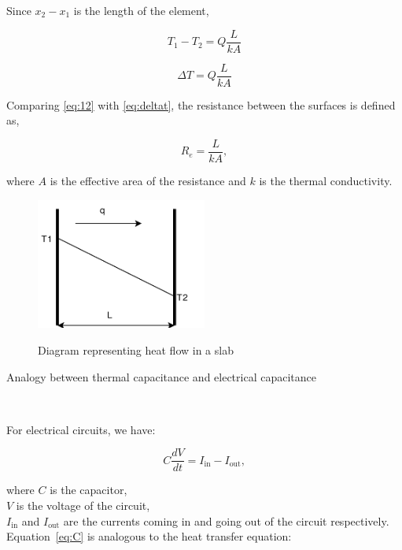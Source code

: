 Since $x_2-x_1$ is the length of the element,

\begin{equation}
T_1-T_2=Q\frac{L}{kA} \label{eq:18}
\end{equation}

\begin{equation}
\Delta T=Q\frac{L}{kA} \label{eq:deltat}
\end{equation}

Comparing \ref{eq:12} with \ref{eq:deltat}, the resistance between the surfaces
is defined as,

\begin{equation}
 R_e=\frac{L}{kA}, \label{eq:reff}
\end{equation}

where $A$ is the effective area of the resistance and $k$ is the thermal conductivity.\\

\begin{figure}
\begin{center}
{
 \includegraphics[width=0.5\textwidth]{heatcircuit.pdf}
}
\caption{Diagram representing heat flow in a slab}
\label{Fig_ThermalCircuit}
\end{center}
\end{figure}

\noindent

\begin{bf}
  Analogy between thermal capacitance and electrical capacitance
\end{bf}
~\newline

For electrical circuits, we have:

\begin{equation}
C\frac{dV}{dt}=I_{\text{in}}-I_{\text{out}}, \label{eq:C}
\end{equation} 

where $C$ is the capacitor,\\
$V$ is the voltage of the circuit,\\
$I_{\text{in}}$ and $I_{\text{out}}$ are the currents coming in and going out of the circuit respectively.\\
Equation~\ref{eq:C} is analogous to the heat transfer equation: 

